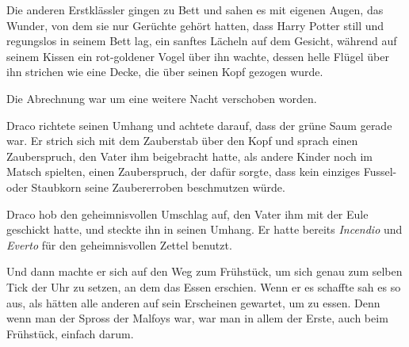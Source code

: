 Die anderen Erstklässler gingen zu Bett und sahen es mit eigenen Augen, das Wunder, von dem sie nur Gerüchte gehört hatten, dass Harry Potter still und regungslos in seinem Bett lag, ein sanftes Lächeln auf dem Gesicht, während auf seinem Kissen ein rot-goldener Vogel über ihn wachte, dessen helle Flügel über ihn strichen wie eine Decke, die über seinen Kopf gezogen wurde.

Die Abrechnung war um eine weitere Nacht verschoben worden.


Draco richtete seinen Umhang und achtete darauf, dass der grüne Saum gerade war. Er strich sich mit dem Zauberstab über den Kopf und sprach einen Zauberspruch, den Vater ihm beigebracht hatte, als andere Kinder noch im Matsch spielten, einen Zauberspruch, der dafür sorgte, dass kein einziges Fussel- oder Staubkorn seine Zaubererroben beschmutzen würde.

Draco hob den geheimnisvollen Umschlag auf, den Vater ihm mit der Eule geschickt hatte, und steckte ihn in seinen Umhang. Er hatte bereits \emph{Incendio} und \emph{Everto} für den geheimnisvollen Zettel benutzt.

Und dann machte er sich auf den Weg zum Frühstück, um sich genau zum selben Tick der Uhr zu setzen, an dem das Essen erschien. Wenn er es schaffte sah es so aus, als hätten alle anderen auf sein Erscheinen gewartet, um zu essen. Denn wenn man der Spross der Malfoys war, war man in allem der Erste, auch beim Frühstück, einfach darum.


